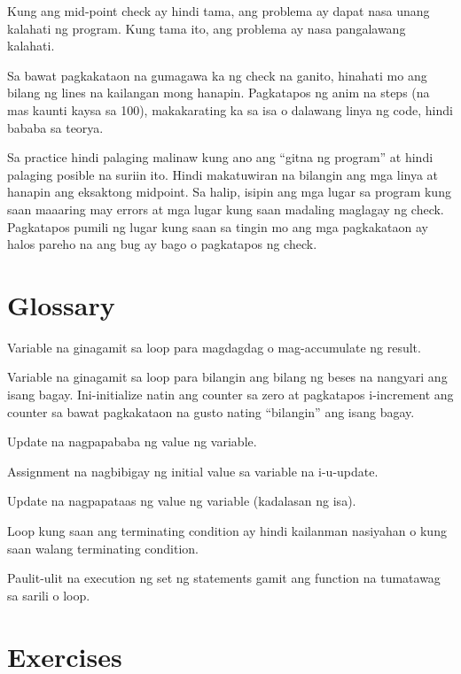 \documentclass[10pt,]{book}
\providecommand{\tightlist}{%
  \setlength{\itemsep}{0pt}\setlength{\parskip}{0pt}}
\begin{document}
Kung ang mid-point check ay hindi tama, ang problema ay dapat nasa unang
kalahati ng program. Kung tama ito, ang problema ay nasa pangalawang
kalahati.

Sa bawat pagkakataon na gumagawa ka ng check na ganito, hinahati mo ang
bilang ng lines na kailangan mong hanapin. Pagkatapos ng anim na steps
(na mas kaunti kaysa sa 100), makakarating ka sa isa o dalawang linya ng
code, hindi bababa sa teorya.

Sa practice hindi palaging malinaw kung ano ang ``gitna ng program'' at
hindi palaging posible na suriin ito. Hindi makatuwiran na bilangin ang
mga linya at hanapin ang eksaktong midpoint. Sa halip, isipin ang mga
lugar sa program kung saan maaaring may errors at mga lugar kung saan
madaling maglagay ng check. Pagkatapos pumili ng lugar kung saan sa
tingin mo ang mga pagkakataon ay halos pareho na ang bug ay bago o
pagkatapos ng check.

\section{Glossary}\label{glossary-4}

\begin{description}
\tightlist
\item[accumulator]
Variable na ginagamit sa loop para magdagdag o mag-accumulate ng result.
\item[counter]
Variable na ginagamit sa loop para bilangin ang bilang ng beses na
nangyari ang isang bagay. Ini-initialize natin ang counter sa zero at
pagkatapos i-increment ang counter sa bawat pagkakataon na gusto nating
``bilangin'' ang isang bagay. 
\item[decrement]
Update na nagpapababa ng value ng variable. 
\item[initialize]
Assignment na nagbibigay ng initial value sa variable na i-u-update.
\item[increment]
Update na nagpapataas ng value ng variable (kadalasan ng isa).
\item[infinite loop]
Loop kung saan ang terminating condition ay hindi kailanman nasiyahan o
kung saan walang terminating condition. 
\item[iteration]
Paulit-ulit na execution ng set ng statements gamit ang function na
tumatawag sa sarili o loop. 
\end{description}

\section{Exercises}\label{exercises-4}
\end{document}
